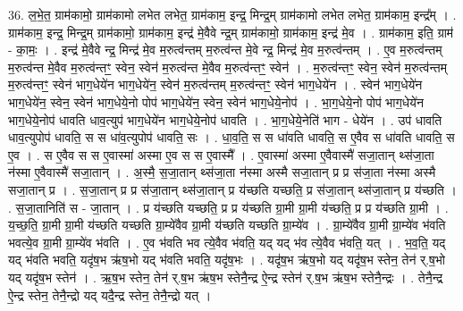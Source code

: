 \documentclass[17pt]{extarticle}
\begin{document}
36. ल॒भे॒त॒ ग्राम॑कामो॒ ग्राम॑कामो लभेत लभेत॒ ग्राम॑काम॒ इन्द्र॒ मिन्द्र॒म् ग्राम॑कामो लभेत लभेत॒ ग्राम॑काम॒ इन्द्र᳚म् । . ग्राम॑काम॒ इन्द्र॒ मिन्द्र॒म् ग्राम॑कामो॒ ग्राम॑काम॒ इन्द्र॑ मे॒वैवे न्द्र॒म् ग्राम॑कामो॒ ग्राम॑काम॒ इन्द्र॑ मे॒व । . ग्राम॑काम॒ इति॒ ग्राम॑ - का॒मः॒ । . इन्द्र॑ मे॒वैवे न्द्र॒ मिन्द्र॑ मे॒व म॒रुत्व॑न्तम् म॒रुत्व॑न्त मे॒वे न्द्र॒ मिन्द्र॑ मे॒व म॒रुत्व॑न्तम् । . ए॒व म॒रुत्व॑न्तम् म॒रुत्व॑न्त मे॒वैव म॒रुत्व॑न्तꣳ॒॒ स्वेन॒ स्वेन॑ म॒रुत्व॑न्त मे॒वैव म॒रुत्व॑न्तꣳ॒॒ स्वेन॑ । . म॒रुत्व॑न्तꣳ॒॒ स्वेन॒ स्वेन॑ म॒रुत्व॑न्तम् म॒रुत्व॑न्तꣳ॒॒ स्वेन॑ भाग॒धेये॑न भाग॒धेये॑न॒ स्वेन॑ म॒रुत्व॑न्तम् म॒रुत्व॑न्तꣳ॒॒ स्वेन॑ भाग॒धेये॑न । . स्वेन॑ भाग॒धेये॑न भाग॒धेये॑न॒ स्वेन॒ स्वेन॑ भाग॒धेये॒नो पोप॑ भाग॒धेये॑न॒ स्वेन॒ स्वेन॑ भाग॒धेये॒नोप॑ । . भा॒ग॒धेये॒नो पोप॑ भाग॒धेये॑न भाग॒धेये॒नोप॑ धावति धाव॒त्युप॑ भाग॒धेये॑न भाग॒धेये॒नोप॑ धावति । . भा॒ग॒धेये॒नेति॑ भाग - धेये॑न । . उप॑ धावति धाव॒त्युपोप॑ धावति॒ स स धा॑व॒त्युपोप॑ धावति॒ सः । . धा॒व॒ति॒ स स धा॑वति धावति॒ स ए॒वैव स धा॑वति धावति॒ स ए॒व । . स ए॒वैव स स ए॒वास्मा॑ अस्मा ए॒व स स ए॒वास्मै᳚ । . ए॒वास्मा॑ अस्मा ए॒वैवास्मै॑ सजा॒तान् थ्स॑जा॒ता न॑स्मा ए॒वैवास्मै॑ सजा॒तान् । . अ॒स्मै॒ स॒जा॒तान् थ्स॑जा॒ता न॑स्मा अस्मै सजा॒तान् प्र प्र स॑जा॒ता न॑स्मा अस्मै सजा॒तान् प्र । . स॒जा॒तान् प्र प्र स॑जा॒तान् थ्स॑जा॒तान् प्र य॑च्छति यच्छति॒ प्र स॑जा॒तान् थ्स॑जा॒तान् प्र य॑च्छति । . स॒जा॒तानिति॑ स - जा॒तान् । . प्र य॑च्छति यच्छति॒ प्र प्र य॑च्छति ग्रा॒मी ग्रा॒मी य॑च्छति॒ प्र प्र य॑च्छति ग्रा॒मी । . य॒च्छ॒ति॒ ग्रा॒मी ग्रा॒मी य॑च्छति यच्छति ग्रा॒म्ये॑वैव ग्रा॒मी य॑च्छति यच्छति ग्रा॒म्ये॑व । . ग्रा॒म्ये॑वैव ग्रा॒मी ग्रा॒म्ये॑व भ॑वति भवत्ये॒व ग्रा॒मी ग्रा॒म्ये॑व भ॑वति । . ए॒व भ॑वति भव त्ये॒वैव भ॑वति॒ यद् यद् भ॑व त्ये॒वैव भ॑वति॒ यत् । . भ॒व॒ति॒ यद् यद् भ॑वति भवति॒ यदृ॑ष॒भ ऋ॑ष॒भो यद् भ॑वति भवति॒ यदृ॑ष॒भः । . यदृ॑ष॒भ ऋ॑ष॒भो यद् यदृ॑ष॒भ स्तेन॒ तेन॑ र्.ष॒भो यद् यदृ॑ष॒भ स्तेन॑ । . ऋ॒ष॒भ स्तेन॒ तेन॑ र्.ष॒भ ऋ॑ष॒भ स्तेनै॒न्द्र ऐ॒न्द्र स्तेन॑ र्.ष॒भ ऋ॑ष॒भ स्तेनै॒न्द्रः । . तेनै॒न्द्र ऐ॒न्द्र स्तेन॒ तेनै॒न्द्रो यद् यदै॒न्द्र स्तेन॒ तेनै॒न्द्रो यत् । \newline
\pagebreak
{}
\end{document}
